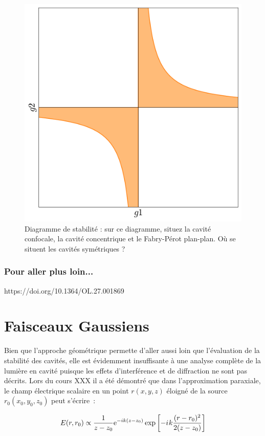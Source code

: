 \documentclass[a4paper]{book}
\newcommand{\iu}{{i\mkern1mu}}
\begin{document}
\begin{figure}[!htbp]
\begin{center}
\includegraphics[width=12cm]{stability.png}
\end{center}
\caption{Diagramme de stabilité : sur ce diagramme, situez la cavité confocale, la cavité concentrique et le Fabry-Pérot plan-plan. Où se situent les cavités symétriques ?}
\label{fig:diag_stab}
\end{figure}

\subsection{Pour aller plus loin...}
https://doi.org/10.1364/OL.27.001869

\chapter{Faisceaux Gaussiens}

Bien que l'approche géométrique permette d'aller aussi loin que l'évaluation de la stabilité des cavités, elle est évidemment insuffisante à une analyse complète de la lumière en cavité puisque les effets d'interférence et de diffraction ne sont pas décrits. Lors du cours XXX il a été démontré que dans l'approximation paraxiale, le champ électrique scalaire en un point $r(x, y, z)$ éloigné de la source $r_0(x_0, y_0, z_0)$ peut s'écrire~: 

\begin{equation}
    E(r,r_0) \propto \frac{1}{z-z_0}\mathrm{e}^{-ik(z-z_0)}\exp\left[-\iu k\frac{(r - r_0)^2}{2(z - z_0)}\right]
    \label{eq:chp_gaussien}
\end{equation}
\end{document}
